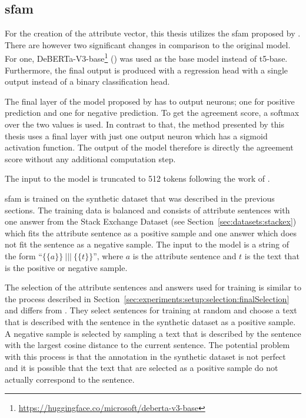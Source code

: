 \subsection{\acf{sfam}}
\label{sec:experiments:setup:sfam}
For the creation of the attribute vector, this thesis utilizes the \acl{sfam} proposed by \citet{patelLearningInterpretableStyle2023}. There are however two significant changes in comparison to the original model. For one, DeBERTa-V3-base\footnote{\url{https://huggingface.co/microsoft/deberta-v3-base}} (\cite{he2021deberta}) was used as the base model instead of t5-base. Furthermore, the final output is produced with a regression head with a single output instead of a binary classification head.

The final layer of the model proposed by \citet{patelLearningInterpretableStyle2023} has to output neurons; one for positive prediction and one for negative prediction. To get the agreement score, a softmax over the two values is used. In contrast to that, the method presented by this thesis uses a final layer with just one output neuron which has a sigmoid activation function. The output of the model therefore is directly the agreement score without any additional computation step.

The input to the model is truncated to 512 tokens following the work of \citet{patelLearningInterpretableStyle2023}.

\acs{sfam} is trained on the synthetic dataset that was described in the previous sections. The training data is balanced and consists of attribute sentences with one answer from the Stack Exchange Dataset (see Section~\ref{sec:datasets:stackex}) which fits the attribute sentence as a positive sample and one answer which does not fit the sentence as a negative sample. The input to the model is a string of the form \enquote{\(\{\{a\}\}~|||~\{\{t\}\}\)}, where \(a\) is the attribute sentence and \(t\) is the text that is the positive or negative sample.

The selection of the attribute sentences and answers used for training is similar to the process described in Section~\ref{sec:experiments:setup:selection:finalSelection} and differs from \citet{patelLearningInterpretableStyle2023}. They select sentences for training at random and choose a text that is described with the sentence in the synthetic dataset as a positive sample. A negative sample is selected by sampling a text that is described by the sentence with the largest cosine distance to the current sentence.
The potential problem with this process is that the annotation in the synthetic dataset is not perfect and it is possible that the text that are selected as a positive sample do not actually correspond to the sentence.

